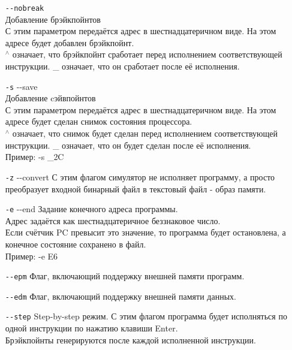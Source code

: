 \begin{enumerate}
	\item[{\tt {-}-nobreak}]\\
	Добавление брэйкпойнтов \\
	С этим параметром передаётся адрес в шестнадцатеричном виде. На этом адресе будет добавлен брэйкпойнт. \\
	$^\wedge$ означает, что брэйкпойнт сработает перед исполнением соответствующей инструкции. \_ означает, что он сработает после её исполнения.
	
	\item[{\tt -s}] {-}-save \\
	Добавление cэйвпойнтов \\
	С этим параметром передаётся адрес в шестнадцатеричном виде. На этом адресе будет сделан снимок состояния процессора. \\
	$^\wedge$ означает, что снимок будет сделан перед исполнением соответствующей инструкции. \_ означает, что он будет сделан после её исполнения. \\
	Пример: -s {\_}2C
	
	\item[{\tt -z}] {-}-convert
	С этим флагом симулятор не исполняет программу, а просто преобразует входной бинарный файл в текстовый файл - образ памяти.\\

	\item[{\tt -e}] {-}-end
	Задание конечного адреса программы. \\
	Адрес задаётся как шестнадцатеричное беззнаковое число. \\
	Если счётчик PC превысит это значение, то программа будет остановлена, а конечное состояние сохранено в файл. \\
	Пример: -e E6
	
	\item[{\tt {-}-epm}]
	Флаг, включающий поддержку внешней памяти программ.
	
	\item[{\tt {-}-edm}]
	Флаг, включающий поддержку внешней памяти данных.
	
	\item[{\tt {-}-step}]
	Step-by-step режим. С этим флагом программа будет исполняться по одной инструкции по нажатию клавиши Enter.\\
	Брэйкпойнты генерируются после каждой исполненной инструкции.
	
\end{enumerate}

